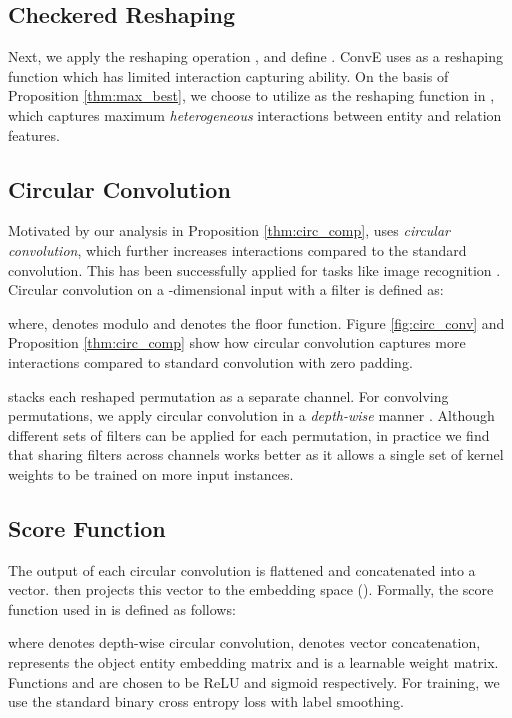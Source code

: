 \documentclass[11pt,a4paper]{article}
\begin{document}
\subsection{Checkered Reshaping}
\label{sec:checkered}
Next, we apply the reshaping operation , and define . ConvE \cite{conve} uses  as a reshaping function which has limited interaction capturing ability. On the basis of Proposition \ref{thm:max_best}, we choose to utilize  as the reshaping function in \method{}, which captures maximum \textit{heterogeneous} interactions between entity and relation features.

\subsection{Circular Convolution}
\label{sec:cconv}
Motivated by our analysis in Proposition \ref{thm:circ_comp}, \method{} uses \textit{circular convolution}, which further increases interactions compared to the standard convolution. This has been successfully applied for tasks like image recognition \cite{omnidirectionalwang2018}. Circular convolution on a -dimensional input  with a filter  is defined as:

where,  denotes  modulo  and  denotes the floor function. Figure \ref{fig:circ_conv} and Proposition \ref{thm:circ_comp} show how circular convolution captures more interactions compared to standard convolution with zero padding.

\method{} stacks each reshaped permutation as a separate channel. For convolving permutations, we apply circular convolution in a \textit{depth-wise} manner \cite{depthwise_convolution}. Although different sets of filters can be applied for each permutation, in practice we find that sharing filters across channels works better as it allows a single set of kernel weights to be trained on more input instances.

\subsection{Score Function}
The output of each circular convolution is flattened and concatenated into a vector. \method{} then projects this vector to the embedding space (). 
Formally, the score function used in \method{} is defined as follows:

where  denotes depth-wise circular convolution,  denotes vector concatenation,  represents the object entity embedding matrix and  is a learnable weight matrix. Functions  and  are chosen to be ReLU and sigmoid respectively. For training, we use the standard binary cross entropy loss with label smoothing.
\end{document}
